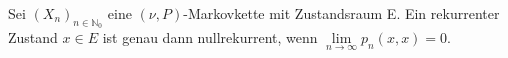 \label{nullrekurrent und limes}
Sei $(X_{n})_{n \in \mathbb{N}_{0}}$ eine $(\nu,P)$-Markovkette mit Zustandsraum E. Ein rekurrenter Zustand $x \in E$ ist genau dann nullrekurrent, wenn $\lim \limits_{n \to \infty} p_{n}(x,x) = 0$.